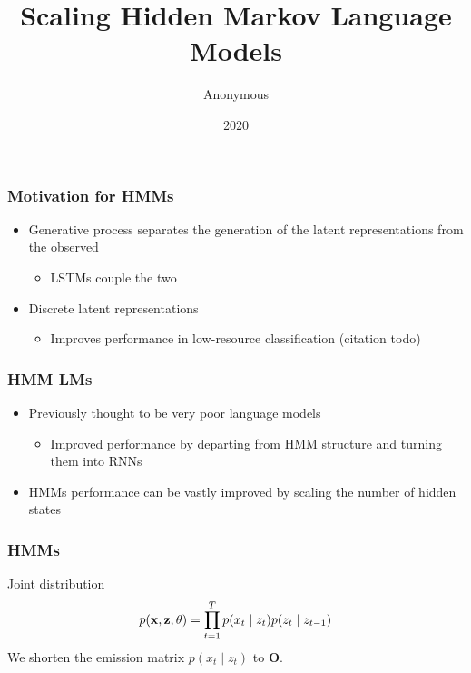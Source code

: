 \documentclass{beamer}
\title{Scaling Hidden Markov Language Models}
\author{Anonymous}
\date{2020}
\begin{document}
\frame{\titlepage}

\begin{frame}
\frametitle{Motivation for HMMs}
\begin{itemize}
\item Generative process separates the generation of the latent representations from the observed
    \begin{itemize}
    \item LSTMs couple the two
    \end{itemize}
\item Discrete latent representations
    \begin{itemize}
    \item Improves performance in low-resource classification (citation todo)
    \end{itemize}
\end{itemize}
\end{frame}

\begin{frame}
\frametitle{HMM LMs}
\begin{itemize}
\item Previously thought to be very poor language models 
    \begin{itemize}
    \item Improved performance by departing from HMM structure and turning them into RNNs \citep{buys2018hmm}
    \end{itemize}
\item HMMs performance can be vastly improved by scaling the number of hidden states
\end{itemize}
\end{frame}

\begin{frame}
\frametitle{HMMs}

\begin{center}
\end{center}


Joint distribution
\begin{equation*}
p(\mathbf{x}, \mathbf{z}; \theta)
= \prod_{t=1}^T p(x_t\mid z_t)p(z_t \mid z_{t-1})
\end{equation*}
We shorten the emission matrix $p(x_t \mid z_t)$ to $\mathbf{O}$.
\end{frame}
\end{document}
